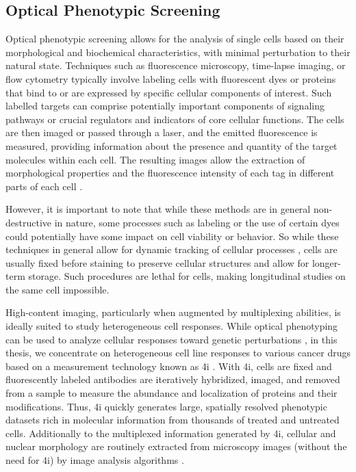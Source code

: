 \subsection{Optical Phenotypic Screening}
\label{sec:background_imaging}

Optical phenotypic screening allows for the analysis of single cells based on their morphological and biochemical characteristics, with minimal perturbation to their natural state. 
Techniques such as fluorescence microscopy, time-lapse imaging, or flow cytometry typically involve labeling cells with fluorescent dyes or proteins that bind to or are expressed by specific cellular components of interest.
Such labelled targets can comprise potentially important components of signaling pathways or crucial regulators and indicators of core cellular functions. 
The cells are then imaged or passed through a laser, and the emitted fluorescence is measured, providing information about the presence and quantity of the target molecules within each cell. 
The resulting images allow the extraction of morphological properties and the fluorescence intensity of each tag in different parts of each cell \citep{carpenter2006cellprofiler}.

However, it is important to note that while these methods are in general non-destructive in nature, some processes such as labeling or the use of certain dyes could potentially have some impact on cell viability or behavior. So while these techniques in general allow for dynamic tracking of cellular processes \citep{tvarusko1999time}, cells are usually fixed before staining to preserve cellular structures and allow for longer-term storage. Such procedures are lethal for cells, making longitudinal studies on the same cell impossible.

High-content imaging, particularly when augmented by multiplexing abilities, is ideally suited to study heterogeneous cell responses.
While optical phenotyping can be used to analyze cellular responses toward genetic perturbations \citep{feldman2022pooled}, in this thesis, we concentrate on heterogeneous cell line responses to various cancer drugs based on a measurement technology known as \acrfull{4i} \citep{gut2018multiplexed}.
With \acrshort{4i}, cells are fixed and fluorescently labeled antibodies are iteratively hybridized, imaged, and removed from a sample to measure the abundance and localization of proteins and their modifications. 
Thus, \acrshort{4i} quickly generates large, spatially resolved phenotypic datasets rich in molecular information from thousands of treated and untreated cells. Additionally to the multiplexed information generated by \acrshort{4i}, cellular and nuclear morphology are routinely extracted from microscopy images (without the need for \acrshort{4i}) by image analysis algorithms \citep{carpenter2006cellprofiler}.

